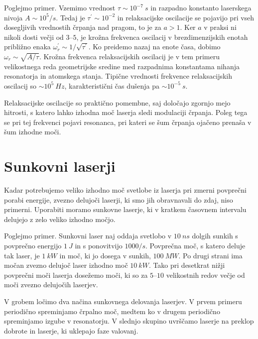 Poglejmo primer. Vzemimo vrednost $\tau \sim 10^{-7}~\si{s}$ in razpadno
konstanto laserskega nivoja $A \sim 10^5/\si{s}$. Tedaj je $\tau^{\prime}\sim 10^{-2}$ 
in relaksacijske oscilacije se pojavijo pri vseh dosegljivih vrednostih črpanja 
nad pragom, to je za $a>1$. Ker $a$ v praksi ni nikoli dosti večji od $3$--$5$, 
je krožna frekvenca oscilacij v brezdimenzijskih enotah približno
enaka $\omega^{\prime}_r\sim 1/\sqrt{\tau^{\prime}}$. Ko preidemo
nazaj na enote časa, dobimo $\omega_r\sim \sqrt{A/\tau}$. Krožna frekvenca 
relaksacijskih oscilacij je v tem primeru velikostnega reda geometrijske 
sredine med razpadnima konstantama nihanja resonatorja in atomskega stanja. 
Tipične vrednosti frekvence relaksacijskih oscilacij so $\sim 10^5~\si{Hz}$, 
karakteristični čas dušenja pa $\sim 10^{-5}~\si{s}$.
\begin{remark}
Relaksacijske oscilacije so praktično pomembne, saj določajo zgornjo mejo
hitrosti, s katero lahko izhodna moč laserja sledi modulaciji črpanja.
Poleg tega se pri tej frekvenci pojavi resonanca, pri kateri se šum črpanja
ojačeno prenaša v šum izhodne moči. 
\end{remark}

\section{Sunkovni laserji}
Kadar potrebujemo veliko izhodno moč svetlobe iz laserja pri zmerni povprečni porabi 
energije, zvezno delujoči laserji, ki smo jih obravnavali do zdaj, 
niso primerni. Uporabiti moramo sunkovne laserje, 
ki v kratkem časovnem intervalu delujejo z zelo veliko izhodno močjo. 

Poglejmo primer. 
Sunkovni laser naj oddaja svetlobo v $10~\si{ns}$ dolgih sunkih 
s povprečno energijo $1~\si{J}$ in s ponovitvijo $1000/\si{s}$.
Povprečna moč, s katero deluje tak laser, je $1~\si{kW}$ in moč, ki jo 
dosega v sunkih, $100~\si{MW}$. Po drugi strani ima močan zvezno delujoč laser  
izhodno moč $10~\si{kW}$. Tako pri desetkrat nižji povprečni moči laserja
dosežemo moči, ki so za $5$--$10$ velikostnih redov večje od moči 
zvezno delujočih laserjev. 

V grobem ločimo dva načina sunkovnega delovanja laserjev. V prvem primeru
periodično spreminjamo črpalno moč, medtem ko v drugem  periodično 
spreminjamo izgube v resonatorju. V slednjo skupino uvrščamo laserje na 
preklop dobrote in laserje, ki uklepajo faze valovanj.   

